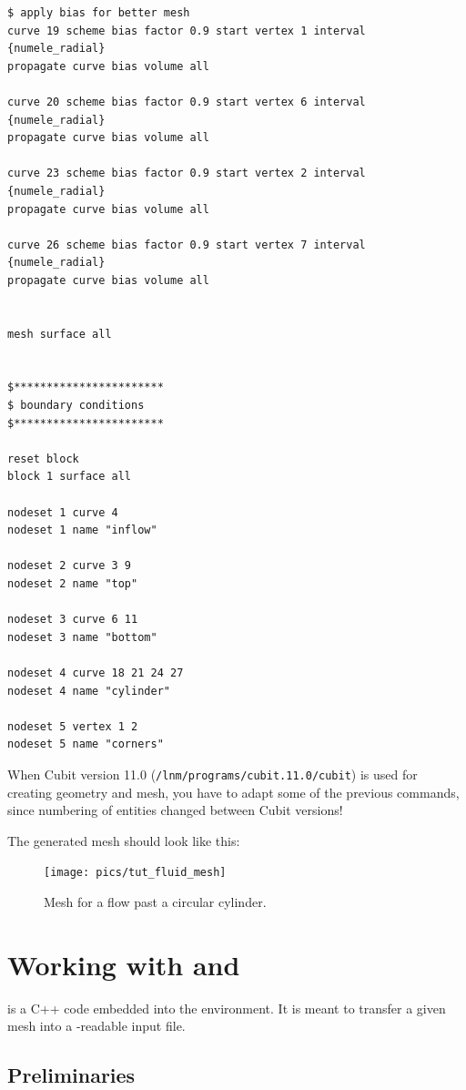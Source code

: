 \begin{small}
\begin{verbatim}
$ apply bias for better mesh
curve 19 scheme bias factor 0.9 start vertex 1 interval {numele_radial}
propagate curve bias volume all

curve 20 scheme bias factor 0.9 start vertex 6 interval {numele_radial}
propagate curve bias volume all

curve 23 scheme bias factor 0.9 start vertex 2 interval {numele_radial}
propagate curve bias volume all

curve 26 scheme bias factor 0.9 start vertex 7 interval {numele_radial}
propagate curve bias volume all


mesh surface all


$***********************
$ boundary conditions
$***********************

reset block
block 1 surface all

nodeset 1 curve 4
nodeset 1 name "inflow"

nodeset 2 curve 3 9
nodeset 2 name "top"

nodeset 3 curve 6 11
nodeset 3 name "bottom"

nodeset 4 curve 18 21 24 27
nodeset 4 name "cylinder"

nodeset 5 vertex 1 2
nodeset 5 name "corners"
\end{verbatim} \end{small}

When Cubit version 11.0 (\texttt{/lnm/programs/cubit.11.0/cubit}) is used for
creating geometry and mesh, you have to adapt some of the previous commands,
since numbering of entities changed between Cubit versions!

The generated mesh should look like this:
\begin{figure}[H]
 \begin{center}
  \texttt{[image: pics/tut\_fluid\_mesh]}
  \caption{Mesh for a flow past a circular cylinder.}
  \label{fig:domainDecomposition}
\end{center}
\end{figure}

\section{Working with \prexo and \baci{}}

\prexo is a C++ code embedded into the \baci{} environment. It is meant to
transfer a given mesh into a \baci{}-readable input file.

\subsection{Preliminaries}

